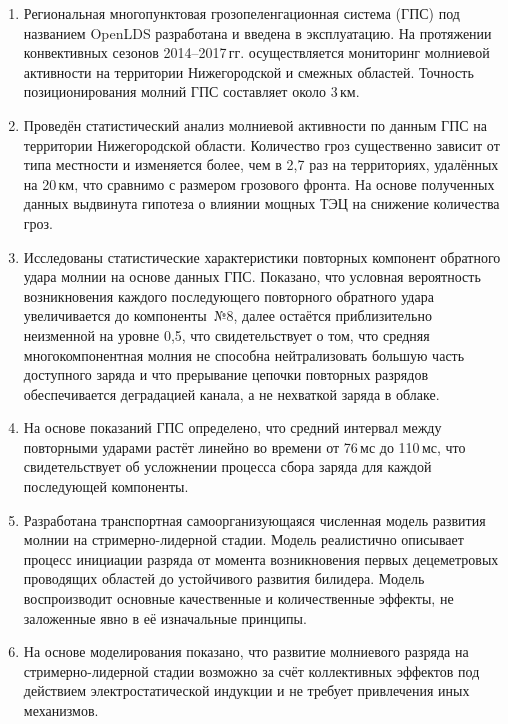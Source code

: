 {}
\begin{enumerate}[beginpenalty=10000] %
  \item Региональная многопунктовая грозопеленгационная система (ГПС) под названием OpenLDS разработана и введена в эксплуатацию. На протяжении конвективных сезонов 2014--2017\,гг. осуществляется мониторинг молниевой активности на территории Нижегородской и смежных областей. Точность позиционирования молний ГПС составляет около 3\,км.
  
  \item Проведён статистический анализ молниевой активности по данным ГПС на территории Нижегородской области. Количество гроз существенно зависит от типа местности и изменяется более, чем в 2,7 раз на территориях, удалённых на 20\,км, что сравнимо с размером грозового фронта. На основе полученных данных выдвинута гипотеза о влиянии мощных ТЭЦ на снижение количества гроз.
  
  \item Исследованы статистические характеристики повторных компонент обратного удара молнии на основе данных ГПС. Показано, что условная вероятность возникновения каждого последующего повторного обратного удара увеличивается до компоненты~№8, далее остаётся приблизительно неизменной на уровне 0,5, что свидетельствует о том, что средняя многокомпонентная молния не способна нейтрализовать большую часть доступного заряда и что прерывание цепочки повторных разрядов обеспечивается деградацией канала, а не нехваткой заряда в облаке.
  
  \item На основе показаний ГПС определено, что средний интервал между повторными ударами растёт линейно во времени от 76\,мс до 110\,мс, что свидетельствует об усложнении процесса сбора заряда для каждой последующей компоненты.
  
  \item Разработана транспортная самоорганизующаяся численная модель развития молнии на стримерно-лидерной стадии. Модель реалистично описывает процесс инициации разряда от момента возникновения первых децеметровых проводящих областей до устойчивого развития билидера. Модель воспроизводит основные качественные и количественные эффекты, не заложенные явно в её изначальные принципы.
  
  \item На основе моделирования показано, что развитие молниевого разряда на стримерно-лидерной стадии возможно за счёт коллективных эффектов под действием электростатической индукции и не требует привлечения иных механизмов.
\end{enumerate}

